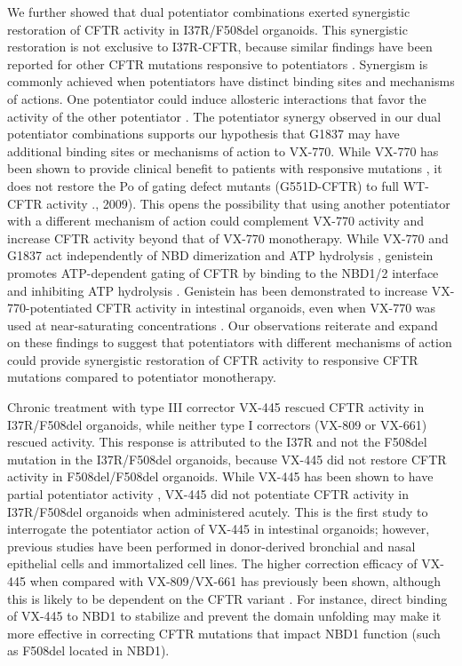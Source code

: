 We further showed that dual potentiator combinations exerted synergistic restoration of CFTR activity in I37R/F508del organoids. This synergistic restoration is not exclusive to I37R-CFTR, because similar findings have been reported for other CFTR mutations responsive to potentiators \cite{dekkers2016a, phuan2018,phuan2019, veit2020}. Synergism is commonly achieved when potentiators have distinct binding sites and mechanisms of actions. One potentiator could induce allosteric interactions that favor the activity of the other potentiator \cite{nussinov2013}. The potentiator synergy observed in our dual potentiator combinations supports our hypothesis that G1837 may have additional binding sites or mechanisms of action to VX-770. While VX-770 has been shown to provide clinical benefit to patients with responsive mutations \cite{berkers2020, mckone2014, volkova2020}, it does not restore the Po of gating defect mutants (G551D-CFTR) to full WT-CFTR activity \cite{vangoor2009}., 2009). This opens the possibility that using another potentiator with a different mechanism of action could complement VX-770 activity and increase CFTR activity beyond that of VX-770 monotherapy. While VX-770 and G1837 act independently of NBD dimerization and ATP hydrolysis \cite{vangoor2009,yeh2017}, genistein promotes ATP-dependent gating of CFTR by binding to the NBD1/2 interface and inhibiting ATP hydrolysis \cite{sohma2013}. Genistein has been demonstrated to increase VX-770-potentiated CFTR activity in intestinal organoids, even when VX-770 was used at near-saturating concentrations \cite{dekkers2016a}. Our observations reiterate and expand on these findings to suggest that potentiators with different mechanisms of action could provide synergistic restoration of CFTR activity to responsive CFTR mutations compared to potentiator monotherapy.

Chronic treatment with type III corrector VX-445 rescued CFTR activity in I37R/F508del organoids, while neither type I correctors (VX-809 or VX-661) rescued activity. This response is attributed to the I37R and not the F508del mutation in the I37R/F508del organoids, because VX-445 did not restore CFTR activity in F508del/F508del organoids. While VX-445 has been shown to have partial potentiator activity \cite{laselva2021,shaughnessy2021, veit2021}, VX-445 did not potentiate CFTR activity in I37R/F508del organoids when administered acutely. This is the first study to interrogate the potentiator action of VX-445 in intestinal organoids; however, previous studies have been performed in donor-derived bronchial and nasal epithelial cells and immortalized cell lines. The higher correction efficacy of VX-445 when compared with VX-809/VX-661 has previously been shown, although this is likely to be dependent on the CFTR variant \cite{keating2018,veit2020a, veit2021a}. For instance, direct binding of VX-445 to NBD1 to stabilize and prevent the domain unfolding may make it more effective in correcting CFTR mutations that impact NBD1 function (such as F508del located in NBD1).

